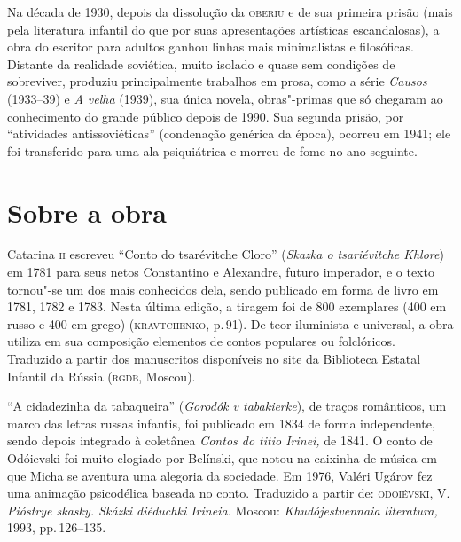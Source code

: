 {Na década de 1930, depois da dissolução da \textsc{oberiu} e de sua primeira
prisão (mais pela literatura infantil do que por suas apresentações
artísticas escandalosas), a obra do escritor para adultos ganhou linhas
mais minimalistas e filosóficas. Distante da realidade soviética, muito
isolado e quase sem condições de sobreviver, produziu principalmente
trabalhos em prosa, como a série \emph{Causos} (1933--39) e \emph{A
velha} (1939), sua única novela, obras"-primas que só chegaram ao
conhecimento do grande público depois de 1990. Sua segunda prisão, por
``atividades antissoviéticas'' (condenação genérica da época), ocorreu
em 1941; ele foi transferido para uma ala psiquiátrica e morreu de fome
no ano seguinte.

\section{Sobre a obra}

\noindent{}Catarina \textsc{ii} escreveu ``Conto do tsarévitche Cloro'' (\emph{Skazka o tsariévitche Khlore}) em 1781 para seus
netos Constantino e Alexandre, futuro imperador, e o texto tornou"-se um
dos mais conhecidos dela, sendo publicado em forma de livro em 1781,
1782 e 1783. Nesta última edição, a tiragem foi de 800 exemplares (400
em russo e 400 em grego) (\textsc{kravtchenko}, p.\,91). De teor iluminista e
universal, a obra utiliza em sua composição elementos de contos
populares ou folclóricos. Traduzido a partir dos
manuscritos disponíveis no site da Biblioteca Estatal Infantil da Rússia
(\textsc{rgdb}, Moscou).

\medskip

``A cidadezinha da tabaqueira'' (\emph{Gorodók v tabakierke}), de traços
românticos, um marco das letras russas infantis, foi publicado em 1834
de forma independente, sendo depois integrado à coletânea \emph{Contos
do titio Irinei,} de 1841. O conto de Odóievski foi muito elogiado por
Belínski, que notou na caixinha de música em que Micha se
aventura uma alegoria da sociedade. Em 1976, Valéri Ugárov fez uma
animação psicodélica baseada no conto. Traduzido a partir de:
\textsc{odoiévski}, V. \emph{Pióstrye skasky. Skázki diéduchki Irineia.} Moscou:
\emph{Khudójestvennaia literatura,} 1993, pp.\,126--135.

\medskip

}
